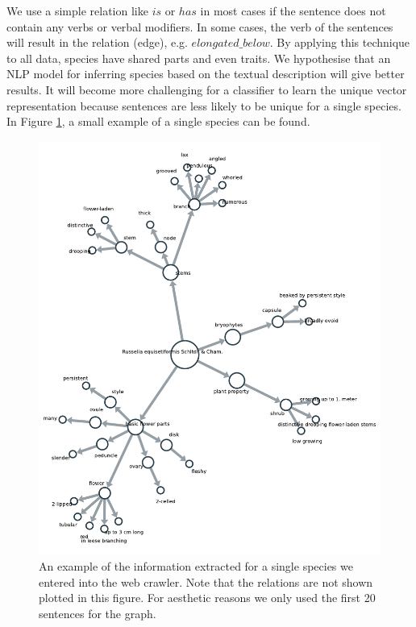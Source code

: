 \documentclass[a4paper, 12pt, oneside]{book} %
\begin{document}
We use a simple relation like $is$ or $has$ in most cases if the sentence does not contain any verbs or verbal modifiers.
In some cases, the verb of the sentences will result in the relation (edge), e.g. $elongated\_below$.
By applying this technique to all data, species have shared parts and even traits.
We hypothesise that an NLP model for inferring species based on the textual description will give better results.
It will become more challenging for a classifier to learn the unique vector representation because sentences are less likely to be unique for a single species.
In Figure \ref{fig:kngraph_unweighted}, a small example of a single species can be found.
\begin{figure} [htpb]
    \centering
    \includegraphics[width=\textwidth]{figures/kngraph_unweighted.pdf}
    \caption[Example of an unweighted knowledge graph]{An example of the information extracted for a single species we entered into the web crawler. Note that the relations are not shown plotted in this figure. For aesthetic reasons we only used the first 20 sentences for the graph.}
    \label{fig:kngraph_unweighted}
\end{figure}
\end{document}
